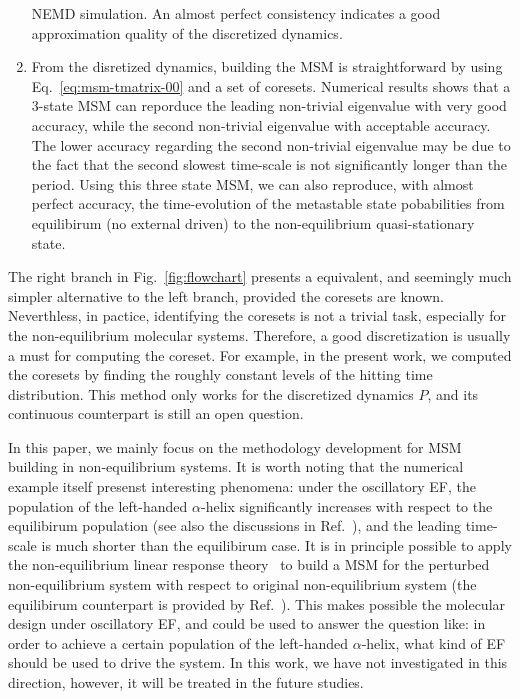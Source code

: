\documentclass[aps, pre, preprint,unsortedaddress,a4paper,onecolumn]{revtex4}
\begin{document}
\begin{enumerate}
  NEMD simulation. An almost perfect consistency 
  indicates a good approximation quality of the discretized dynamics.
\item From the disretized dynamics, building the MSM is straightforward
  by using Eq.~\eqref{eq:msm-tmatrix-00} and a set of coresets.
  Numerical results shows that a 3-state MSM can reporduce the leading
  non-trivial eigenvalue with very good accuracy, while the second
  non-trivial eigenvalue with acceptable accuracy. The lower accuracy
  regarding the second non-trivial eigenvalue may be due to the fact that
  the second slowest time-scale is not significantly longer than the
  period. Using this three state MSM, we can also reproduce, with
  almost perfect accuracy, the 
  time-evolution of the metastable state
  pobabilities from equilibirum (no external driven)
  to the non-equilibrium quasi-stationary state.
\end{enumerate}

The right branch in Fig.~\ref{fig:flowchart} presents a
equivalent, and seemingly
much simpler alternative to the left branch, provided the
coresets are known. Neverthless, in pactice, identifying
the coresets is not a trivial task, especially for the
non-equilibrium molecular systems.
Therefore, a good discretization is  usually a must for computing the coreset.
For example, in the present work, we computed the coresets by
finding the roughly constant levels of the hitting time distribution.
This method only works for the discretized dynamics $P$, and its continuous
counterpart is still an open question.

In this paper, we mainly focus on the methodology development for MSM
building in non-equilibrium systems. It is worth noting that the
numerical example itself presenst interesting phenomena: under the
oscillatory EF, the population of the left-handed $\alpha$-helix
significantly increases with respect to the equilibirum population
(see also the discussions in Ref.~\cite{wang2014exploring}),
and the leading time-scale is much shorter than the equilibirum case.
It is in principle possible to apply the non-equilibrium
linear response theory~\cite{wang2013linear} to build a MSM for the perturbed
non-equilibrium system with respect to original
non-equilibrium system
(the equilibirum counterpart is provided by Ref.~\cite{schutte2014markov}).
This makes possible the molecular design under
oscillatory EF, and could be used to answer the question like:
in order to achieve a certain population of  the left-handed $\alpha$-helix,
what kind of EF should be used to drive the system.
In this work, we have not investigated in this direction, however, it will
be treated in the future studies.
\end{document}
